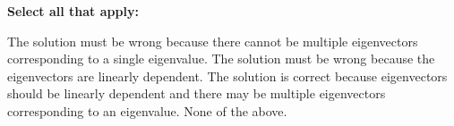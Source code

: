 \documentclass[11pt,addpoints,answers]{exam}
\numberwithin{equation}{section} %
\numberwithin{figure}{section} %
\numberwithin{table}{section} %
\begin{document}
\begin{questions}
    \textbf{Select all that apply:}
    
    \begin{checkboxes}{%
    \checkboxchar{$\Box$} \checkedchar{$\blacksquare$}
        \choice The solution must be wrong because there cannot be multiple eigenvectors corresponding to a single eigenvalue.
        \choice The solution must be wrong because the eigenvectors are linearly dependent.
        \choice The solution is correct because eigenvectors should be linearly dependent and there may be multiple eigenvectors corresponding to an eigenvalue.
        \choice None of the above.
    }
    \end{checkboxes}
    
    
    
    \clearpage
\end{questions}
\end{document}
